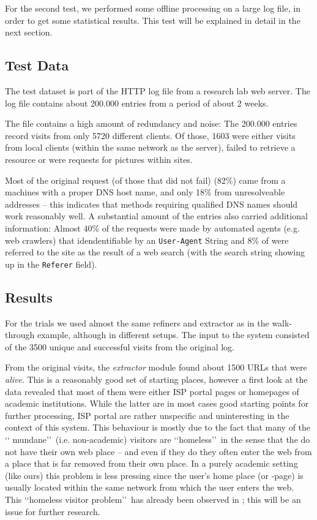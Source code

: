 \documentclass[a4paper]{danarticle}
\theoremstyle{remark}
\begin{document}
    For the second test, we performed some offline processing on a large log 
    file, in order to get some statistical results. This test will be explained 
    in detail in the next section.
    \subsection{Test Data}
      The test dataset is part of the HTTP log file from a research lab
      web server. The log file contains about 200.000 entries from a period of
      about 2 weeks.
      
      The file contains a high amount of redundancy and noise: The 200.000 
      entries record visits from only 5720 different clients. Of those, 1603 
      were either visits from local clients (within the same network as the 
      server), failed to retrieve a resource or were requests for pictures 
      within sites.
      
      Most of the original request (of those that did not fail) (82\%) came from a 
      machines with a proper
      DNS host name, and only 18\% from unresolveable addresses -- this indicates
      that methods requiring qualified DNS names should work reasonably well. A
      substantial amount of the entries also carried additional information:
      Almost 40\% of the requests were made by automated agents (e.g. web
      crawlers) that idendentifiable by an \verb$User-Agent$ String and 8\% of
      were referred to the site as the result of a web search (with the search
      string showing up in the \verb$Referer$ field). 
    \subsection{Results}
      For the trials we used almost the same refiners and extractor as in the
      walk-through example, although in different setups. The input to the 
      system consisted of the 3500 unique and successful visits from the original 
      log. 
      
      From the original visits, 
      the \textit{extractor} module found about 1500 URLs that
      were \textit{alive}. This is a reasonably good set of starting places,
      however a first look at the data revealed that most of them were either
      ISP portal pages or homepages of academic institutions. While the latter
      are in most cases good starting points for further processing, ISP portal
      are rather unspecific and uninteresting in the context of this system.
      This behaviour is mostly due to the fact that many of the \lq\lq
      mundane\rq\rq\ (i.e. non-academic) visitors are \lq\lq homeless\rq\rq\ in
      the sense that the do not have their own web place -- and even if they do
      they often enter the web from a place that is far removed from their own
      place. In a purely academic setting (like ours) this problem is less
      pressing since the user's home place (or -page) is usually located within
      the same network from which the user enters the web. This \lq\lq homeless
      visitor problem\rq\rq\ has already been observed in \cite{webaware};
      this will be an issue for further research.
      
\end{document}
